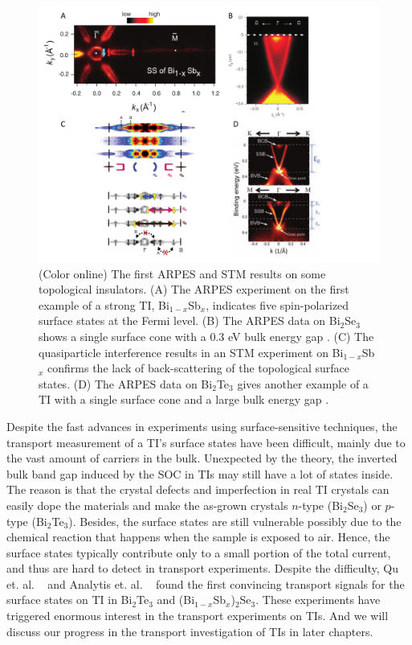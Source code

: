 \begin{figure}[htb]
  \begin{center}            
\includegraphics[width=0.9\linewidth]{ch-intro/figures/ARPES_STM.pdf} 
\caption{\label{ARPES_STM} (Color online) 
The first ARPES and STM results on some topological insulators. (A) The ARPES experiment on the first example of a strong TI, Bi$_{1-x}$Sb$_x$, indicates five spin-polarized surface states at the Fermi level\cite{Hsieh09}. (B) The ARPES data on Bi$_2$Se$_3$ shows a single surface cone with a 0.3 eV bulk energy gap \cite{Xia09}.  (C) The quasiparticle interference results in an STM experiment on Bi$_{1-x}$Sb$_x$ confirms the lack of back-scattering of the topological surface states. (D) The ARPES data on Bi$_2$Te$_3$ gives another example of a TI with a single surface cone and a large bulk energy gap \cite{Chen09}.
} 
  \end{center}
\end{figure}

Despite the fast advances in experiments using surface-sensitive techniques, the transport measurement of a TI's surface states have been difficult, mainly due to the vast amount of carriers in the bulk. Unexpected by the theory, the inverted bulk band gap induced by the SOC in TIs may still have a lot of states inside. The reason is that the crystal defects and imperfection in real TI crystals can easily dope the materials and make the as-grown crystals $n$-type (Bi$_2$Se$_3$) or $p$-type (Bi$_2$Te$_3$). Besides, the surface states are still vulnerable possibly due to the chemical reaction that happens when the sample is exposed to air. Hence, the surface states typically contribute only to a small portion of the total current, and thus are hard to detect in transport experiments. Despite the difficulty, Qu et. al. ~\cite{Qu} and Analytis et. al. ~\cite{Analytis} found the first convincing transport signals for the surface states on TI in Bi$_2$Te$_3$ and (Bi$_{1-x}$Sb$_x$)$_2$Se$_3$. These experiments have triggered enormous interest in the transport experiments on TIs. And we will discuss our progress in the transport investigation of TIs in later chapters. 


